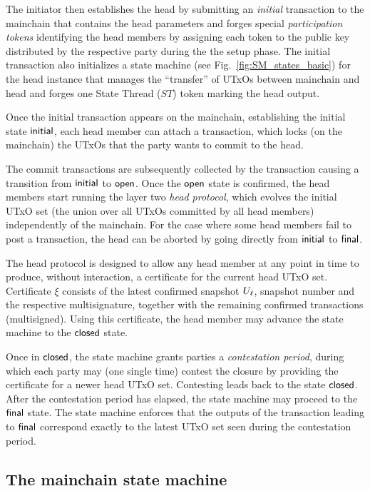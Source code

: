 The initiator then establishes the head by submitting an
\emph{initial} transaction to the mainchain that contains the
head parameters and forges special \emph{participation tokens}
identifying the head members by assigning each token to the public key
distributed by the respective party during the the setup phase.
The initial transaction also initializes a state machine
(see Fig.~\ref{fig:SM_states_basic}) for the head instance that manages
the ``transfer'' of UTxOs between mainchain and head and forges one State Thread ($ST$) token marking the head output.

Once the initial transaction appears on the mainchain, establishing
the initial state $\mathsf{initial}$, each head member can attach a
\mtxCom{} transaction, which locks (on the mainchain) the UTxOs that
the party wants to commit to the head.

The commit transactions are subsequently collected by the \mtxCCom{} transaction
causing a transition from $\mathsf{initial}$ to $\mathsf{open}$. Once the $\mathsf{open}$ state is
confirmed, the head members start running the layer two \emph{head protocol},
which evolves the initial UTxO set (the union over all UTxOs committed by all
head members) independently of the mainchain. For the case where some head
members fail to post a \mtxCom{} transaction, the head can be aborted by going
directly from $\mathsf{initial}$ to $\mathsf{final}$.

The head protocol is designed to allow any head member
at any point in time to produce, without interaction, a certificate 
for the current head UTxO set.
Certificate $\xi$ consists of the latest
confirmed snapshot $U_\ell$, snapshot number and the respective multisignature, together
with the remaining confirmed transactions (multisigned).
Using this certificate, the head member
may advance the state machine to the $\mathsf{closed}$ state.

Once in $\mathsf{closed}$, the state machine grants parties a
\emph{contestation period}, during which each party may (one single
time) contest the closure by providing the certificate for a newer head
UTxO set.  Contesting leads back to the state $\mathsf{closed}$.
After the contestation period has elapsed, the state machine may proceed
to the $\mathsf{final}$ state.  The state machine enforces that the
outputs of the transaction leading to $\mathsf{final}$ correspond exactly to
the latest UTxO set seen during the contestation period.


\subsection{The mainchain state machine}\label{sec:overview_mc}

